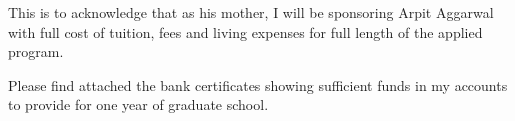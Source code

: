 \documentclass[11pt, a4paper]{awesome-cv}
\begin{document}
\makecvheader

\makelettertitle

\begin{cvletter}
This is to acknowledge that as his mother, I will be sponsoring Arpit Aggarwal with full cost of tuition, fees and living expenses for full length of the applied program.

Please find attached the bank certificates showing sufficient funds in my accounts to provide for one year of graduate school.

\end{cvletter}

\makeletterclosing
\end{document}
